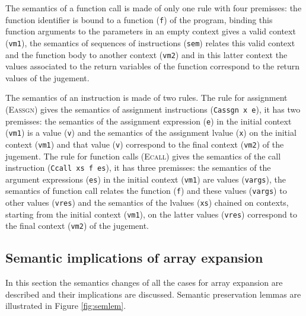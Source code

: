 \documentclass{article}
\begin{document}
\smallskip

The semantics of a function call is made of only one rule with four premisses:
the function identifier is bound to a function (\texttt{f}) of the program,
binding this function arguments to the parameters in an empty context gives a
valid context (\texttt{vm1}), the semantics of sequences of instructions
(\texttt{sem}) relates this valid context and the function body to another
context (\texttt{vm2}) and in this latter context the values associated to the
return variables of the function correspond to the return values of the jugement.

\smallskip

The semantics of an instruction is made of two rules. The rule for assignment
(\textsc{Eassgn}) gives the semantics of assignment instructions
(\texttt{Cassgn x e}), it has two premisses: the semantics of the assignment
expression (\texttt{e}) in the initial context (\texttt{vm1}) is a value
(\texttt{v}) and the semantics of the assignment lvalue (\texttt{x}) on the
initial context (\texttt{vm1}) and that value (\texttt{v}) correspond to the
final context (\texttt{vm2}) of the jugement. The rule for function calls
(\textsc{Ecall}) gives the semantics of the call instruction
(\texttt{Ccall xs f es}), it has three premisses: the semantics of the argument
expressions (\texttt{es}) in the initial context (\texttt{vm1}) are values
(\texttt{vargs}), the semantics of function call relates the function
(\texttt{f}) and these values (\texttt{vargs}) to other values (\texttt{vres})
and the semantics of the lvalues (\texttt{xs}) chained on contexts, starting
from the initial context (\texttt{vm1}), on the latter values (\texttt{vres})
correspond to the final context (\texttt{vm2}) of the jugement.


\subsection{Semantic implications of array expansion}

In this section the semantics changes of all the cases for array expansion are
described and their implications are discussed. Semantic preservation lemmas are
illustrated in Figure \ref{fig:semlem}.

\smallskip
\end{document}
